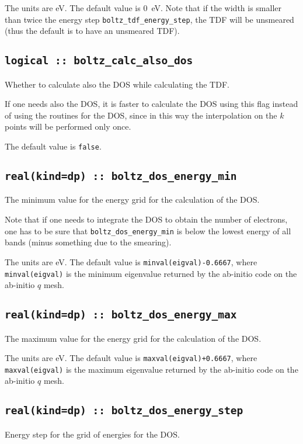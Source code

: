 The units are eV.
The default value is 0~eV. Note that if the width is smaller than twice the energy step {\tt boltz\_tdf\_energy\_step}, the TDF will be unsmeared (thus the default is to have an unsmeared TDF).

\subsection[boltz\_calc\_also\_dos]{\tt logical :: boltz\_calc\_also\_dos}
Whether to calculate also the DOS while calculating the TDF.

If one needs also the DOS, it is faster to calculate the DOS using this flag instead of using the routines for the DOS, since in this way the interpolation on the $k$ points will be performed only once.

The default value is \verb#false#.

\subsection[boltz\_dos\_energy\_min]{\tt real(kind=dp) :: boltz\_dos\_energy\_min}
The minimum value for the energy grid for the calculation of the DOS.

Note that if one needs to integrate the DOS to obtain the number of electrons, one has to be sure that {\tt boltz\_dos\_energy\_min} is below the lowest energy of all bands (minus something due to the smearing).

The units are eV.
The default value is {\tt minval(eigval)-0.6667}, where  {\tt minval(eigval)} is the minimum eigenvalue returned by the ab-initio code on the ab-initio $q$ mesh.

\subsection[boltz\_dos\_energy\_max]{\tt real(kind=dp) :: boltz\_dos\_energy\_max}
The maximum value for the energy grid for the calculation of the DOS.

The units are eV.
The default value is {\tt maxval(eigval)+0.6667}, where  {\tt maxval(eigval)} is the maximum eigenvalue returned by the ab-initio code on the ab-initio $q$ mesh.

\subsection[boltz\_dos\_energy\_step]{\tt real(kind=dp) :: boltz\_dos\_energy\_step}
Energy step for the grid of energies for the DOS.


